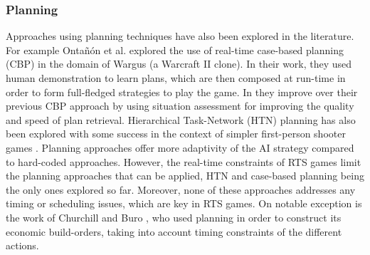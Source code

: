 \documentclass{llncs}
\begin{document}


\subsubsection{Planning}
Approaches using  planning techniques have  also been explored  in the
literature.  For example  Onta\~{n}\'{o}n  et al.  \cite{CBR_Planning}
explored the use of real-time  case-based planning (CBP) in the domain
of  Wargus (a  Warcraft  II clone).  In their  work,  they used  human
demonstration to learn  plans, which are then composed  at run-time in
order  to   form  full-fledged  strategies   to  play  the   game.  In
\cite{PlanRetrieval} they improve over  their previous CBP approach by
using situation assessment for improving the quality and speed of plan
retrieval.  Hierarchical Task-Network  (HTN)  planning  has also  been
explored  with some  success in  the context  of simpler  first-person
shooter  games  \cite{HTNPlanning}.  Planning  approaches  offer  more
adaptivity    of   the    AI   strategy    compared   to    hard-coded
approaches. However, the real-time constraints  of RTS games limit the
planning approaches that  can be applied, HTN  and case-based planning
being  the  only  ones  explored  so  far.  Moreover,  none  of  these
approaches addresses any timing or scheduling issues, which are key in
RTS games.  On notable  exception is  the work  of Churchill  and Buro
\cite{churchill2011build}, who used planning in order to construct its
economic build-orders,  taking into account timing  constraints of the
different actions.

\end{document}

